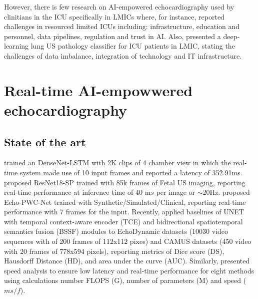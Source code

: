 \documentclass[mlabstract,twocolumn]{jmlr}
\begin{document}
However, there is few research on AI-empowered echocardiography used by clinitians in the ICU specifically in LMICs where, for instance, \cite{2021-huyNhat-vanHao-in-FAIR-MICCAI} reported challenges in resourced limited ICUs including: infrastructure, education and personnel, data pipelines, regulation and trust in AI.
Also, \cite{2021-kerdegari-Applied-Sciences-MDPI, 2021-kerdegari-ISBI-IEEE, 2021-huyNhat-kerdegari-in-FAIR-MICCAI} presented a deep-learning lung US pathology classifier for ICU patients in LMIC, stating the challenges of data imbalance, integration of technology and IT infrastructure.

\section{Real-time AI-empowwered echocardiography}
\subsection{State of the art}  \label{subsec:State_of_the_art}
\citet{woudenberg2018} trained an DenseNet-LSTM with 2K clips of 4 chamber view in which the real-time system made use of 10 input frames and reported a latency of 352.91ms.
\citet{toussaint2018-MICCAI} proposed ResNet18-SP trained with 85k frames of Fetal US imaging, reporting real-time performance at inference time of 40 m$s$ per image or $\sim$20Hz.
\citet{ostvik2021-TMI} proposed Echo-PWC-Net trained with Synthetic/Simulated/Clinical, reporting real-time performance with 7 frames for the input.
Recently, \citet{wu2022} applied baselines of UNET with temporal context-aware encoder (TCE) and bidirectional spatiotemporal semantics fusion (BSSF) modules to EchoDynamic datasets (10030 video sequences with of 200 frames of 112x112 pixes) and CAMUS datasets  (450 video with 20 frames of 778x594 pixels), reporting metrics of Dice score (DS), Hausdorff Distance (HD), and area under the curve (AUC).
Similarly, \citet{wu2022} presented speed analysis to ensure low latency and real-time performance for eight methods using calculations number FLOPS (G), number of parameters (M) and speed ($ms/f$).
\end{document}
